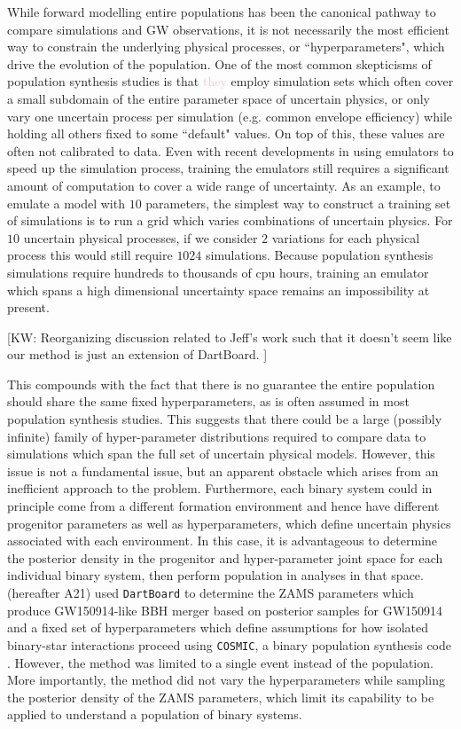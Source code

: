 \documentclass[twocolumn]{aastex631}
\newcommand{\kw}[1]{{\color{rb4}[KW: #1 ]}}
\newcommand{\kb}[1]{\textcolor{pink}{#1}}
\begin{document}
While forward modelling entire populations has been the canonical pathway to compare simulations and GW observations,
it is not necessarily the most efficient way to constrain the underlying physical processes, or ``hyperparameters", which drive the evolution of the population.
One of the most common skepticisms of population synthesis studies is that \kb{they} employ simulation sets which often 
cover a small subdomain of the entire parameter space of uncertain physics, or only vary one uncertain process per simulation
(e.g. common envelope efficiency) while holding all others fixed to some ``default" values.
On top of this, these values are often not calibrated to data.
Even with recent developments in using emulators to speed up the simulation process, training the emulators 
still requires a significant amount of computation to cover a wide range of uncertainty.
As an example, to emulate a model with $10$ parameters, the simplest way to construct a training set of simulations is to 
run a grid which varies combinations of uncertain physics.
For $10$ uncertain physical processes, if we consider $2$ variations for each physical process 
this would still require $1024$ simulations.
Because population synthesis simulations require hundreds to thousands of cpu hours,
training an emulator which spans a high dimensional uncertainty space remains an impossibility at present.

\kw{Reorganizing discussion related to Jeff's work such that it doesn't seem like our method is just an extension of DartBoard.}

This compounds with the fact that there is no guarantee the entire population should share the same fixed hyperparameters, 
as is often assumed in most population synthesis studies.
This suggests that there could be a large (possibly infinite) family of hyper-parameter distributions 
required to compare data to simulations which span the full set of uncertain physical models.
However, this issue is not a fundamental issue, but an apparent obstacle which arises from an inefficient approach to the problem.
Furthermore, each binary system could in principle come from a different formation environment and hence 
have different progenitor parameters as well as hyperparameters, which define uncertain physics associated with each environment.
In this case, it is advantageous to determine the posterior density in the progenitor and hyper-parameter joint space 
for each individual binary system, then perform population in analyses in that space.
\citet{Andrews2021} (hereafter A21) used \texttt{DartBoard} \citep{Andrews2018} 
to determine the ZAMS parameters which produce GW150914-like BBH merger based on posterior samples for GW150914 and a fixed 
set of hyperparameters which define assumptions for how isolated binary-star interactions proceed using 
\texttt{COSMIC}, a binary population synthesis code \citep{Breivik2020}.
However, the method was limited to a single event instead of the population.
More importantly, the method did not vary the hyperparameters while sampling the posterior density of the ZAMS parameters,
which limit its capability to be applied to understand a population of binary systems.
\end{document}
